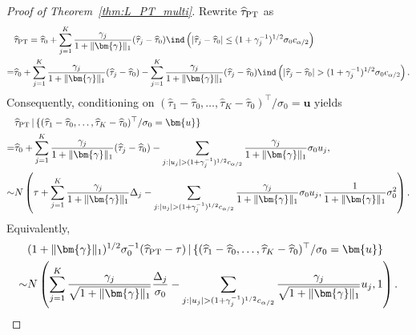 \documentclass[11pt]{article}
\def\given{\,|\,}
\newcommand{\htau}{\widehat\tau}
\numberwithin{equation}{section}
\theoremstyle{definition}
\begin{document}
\begin{proof}[Proof of Theorem~\ref{thm:L_PT_multi}]
Rewrite $\htau_{\rm PT}$ as
\begin{align*}
  &\htau_{\rm PT} = \htau_0 + \sum_{j=1}^K \frac{\gamma_j}{1+\lVert \bm{\gamma} \rVert_1} (\htau_j - \htau_0) \ind\left(\lvert \htau_j - \htau_0 \rvert \le (1+\gamma_j^{-1})^{1/2}\sigma_0 c_{\alpha/2}\right)\\
  =& \htau_0 + \sum_{j=1}^K \frac{\gamma_j}{1+\lVert \bm{\gamma} \rVert_1} (\htau_j - \htau_0) - \sum_{j=1}^K \frac{\gamma_j}{1+\lVert \bm{\gamma} \rVert_1} (\htau_j - \htau_0) \ind\left(\lvert \htau_j - \htau_0 \rvert > (1+\gamma_j^{-1})^{1/2}\sigma_0 c_{\alpha/2}\right).
\end{align*}
Consequently, conditioning on $(\htau_1 - \htau_0, \ldots, \htau_K - \htau_0)^\top/\sigma_0=\bm{u}$ yields
\begin{align*}
  &\htau_{\rm PT} \given \{(\htau_1 - \htau_0, \ldots, \htau_K - \htau_0)^\top/\sigma_0 = \bm{u}\}\\
  =& \htau_0 + \sum_{j=1}^K \frac{\gamma_j}{1+\lVert \bm{\gamma} \rVert_1} (\htau_j - \htau_0) - \sum_{j: \lvert u_j \rvert > (1+\gamma_j^{-1})^{1/2} c_{\alpha/2}} \frac{\gamma_j}{1+\lVert \bm{\gamma} \rVert_1} \sigma_0 u_j,\\
  \sim& N\left(\tau + \sum_{j=1}^K \frac{\gamma_j}{1+\lVert \bm{\gamma} \rVert_1} \Delta_j - \sum_{j: \lvert u_j \rvert > (1+\gamma_j^{-1})^{1/2} c_{\alpha/2}} \frac{\gamma_j}{1+\lVert \bm{\gamma} \rVert_1} \sigma_0 u_j, \frac{1}{1+\lVert \bm{\gamma} \rVert_1} \sigma_0^2\right).
\end{align*}
Equivalently,
\begin{align*}
  &(1+\lVert \bm{\gamma}\rVert_1)^{1/2}\sigma_0^{-1}(\htau_{\rm PT} - \tau)\given \{(\htau_1 - \htau_0, \ldots, \htau_K - \htau_0)^\top/\sigma_0 = \bm{u}\} \\
  \sim& N\left(\sum_{j=1}^K \frac{\gamma_j}{\sqrt{1+\lVert \bm{\gamma} \rVert_1}} \frac{\Delta_j}{\sigma_0} - \sum_{j: \lvert u_j \rvert > (1+\gamma_j^{-1})^{1/2} c_{\alpha/2}} \frac{\gamma_j}{\sqrt{1+\lVert \bm{\gamma} \rVert_1}} u_j, 1\right).
\end{align*}


\end{proof}
\end{document}
